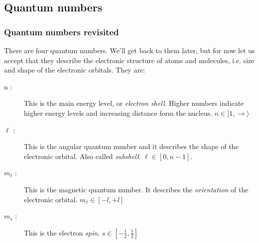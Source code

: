 \documentclass[a4paper,titlepage]{article}
\begin{document}
\subsection{Quantum numbers}
\label{quantno}

\begin{frame}
\frametitle{Quantum numbers revisited}

There are four quantum numbers. We'll get back to them later, but for now let us accept that they describe the electronic structure of atoms and molecules, i.e. size and shape of the electronic orbitals. They are:

\begin{description}
\item[n :] This is the main energy level, or \textit{electron shell}. Higher numbers indicate higher energy levels and increasing distance form the nucleus. \(n \in [1,\rightarrow\rangle\)
\item[\(\ell\) :] This is the angular quantum number and it describes the shape of the electronic orbital. Also called \textit{subshell}. \(\ell \in [0,n-1]\). 
\item[\(m_\ell\) :] This is the magnetic quantum number. It describes the \textit{orientation} of the electronic orbital. \(m_\ell \in [-l,+l]\)
\item[\(m_s\) :] This is the electron \textit{spin}. \(s\in [-\frac{1}{2},\frac{1}{2}]\)
\end{description}
\end{frame}
\end{document}
